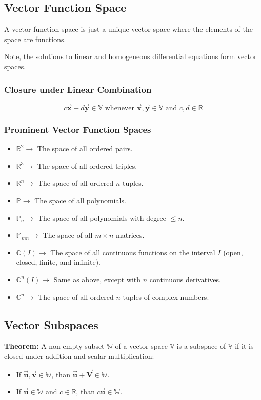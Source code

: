 \documentclass[12pt,landscape,twocolumn]{article}
\let\oldvec\vec
\renewcommand{\vec}[1]{\oldvec{\mathbf{ #1 } } }                    %
\begin{document}
    \subsection{Vector Function Space}
    A vector function space is just a unique vector space where the elements of the space are functions.

    Note, the solutions to linear and homogeneous differential equations form vector spaces.

        \subsubsection{Closure under Linear Combination}
        \begin{equation}\label{eq:funcspace_closure}
            c \vec{x} + d \vec{y} \in \mathbb{V} \text{ whenever } \vec{x}, \vec{y} \in \mathbb{V} \text{ and } c, d \in \mathbb{R}
        \end{equation}

        \subsubsection{Prominent Vector Function Spaces}
        \begin{itemize}
            \item $\mathbb{R}^2 \to$ The space of all ordered pairs.
            \item $\mathbb{R}^3 \to$ The space of all ordered triples.
            \item $\mathbb{R}^n \to$ The space of all ordered $n$-tuples.
            \item $\mathbb{P} \to$ The space of all polynomials.
            \item $\mathbb{P}_n \to$ The space of all polynomials with degree $\le n$.
            \item $\mathbb{M}_{mn} \to$ The space of all $m \times n$ matrices.
            \item $\mathbb{C}(I) \to$ The space of all continuous functions on the interval $I$ (open, closed, finite, and infinite).
            \item $\mathbb{C}^n(I) \to$ Same as above, except with $n$ continuous derivatives.
            \item $\mathbb{C}^n \to$ The space of all ordered $n$-tuples of complex numbers.
        \end{itemize}

    \subsection{Vector Subspaces}
    \textbf{Theorem:} A non-empty subset $\mathbb{W}$ of a vector space $\mathbb{V}$ is a subspace of $\mathbb{V}$ if it is closed under addition and scalar multiplication:
    \begin{itemize}
        \item If $\vec{u}, \vec{v} \in \mathbb{W}$, than $\vec{u} + \vec{V} \in \mathbb{W}$.
        \item If $\vec{u} \in \mathbb{W}$ and $c \in \mathbb{R}$, than $c\vec{u} \in \mathbb{W}$.
    \end{itemize}
\end{document}
